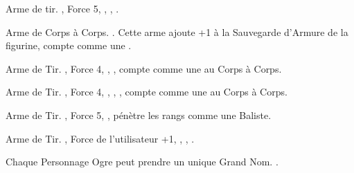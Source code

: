 \listitemonecol{\forgerepeater} Arme de tir. , Force 5, \flamingattacks, , \quicktofire.



\listitemonecol{\ironfist} Arme de Corps à Corps. \requirestwohands{}. Cette arme ajoute +1 à la Sauvegarde d'Armure de la figurine, compte comme une \pw{} .

\listitemonecol{\ogrepistol} Arme de Tir. , Force 4, \quicktofire{}, , compte comme une \pw{} au Corps à Corps.

\listitemonecol{\braceofogrepistols} Arme de Tir. , Force 4, \quicktofire{}, , , compte comme une \pw{} au Corps à Corps.

\listitemonecol{\ogrecrossbow} Arme de Tir. , Force 5, , pénètre les rangs comme une Baliste.

\listitemonecol{\huntingspear} Arme de Tir. , Force de l'utilisateur +1, \quicktofire{}, , .

\enditemlistonecol

\closearmyarmoury



\spaceaftersection{}

Chaque Personnage Ogre peut prendre un unique Grand Nom. .

